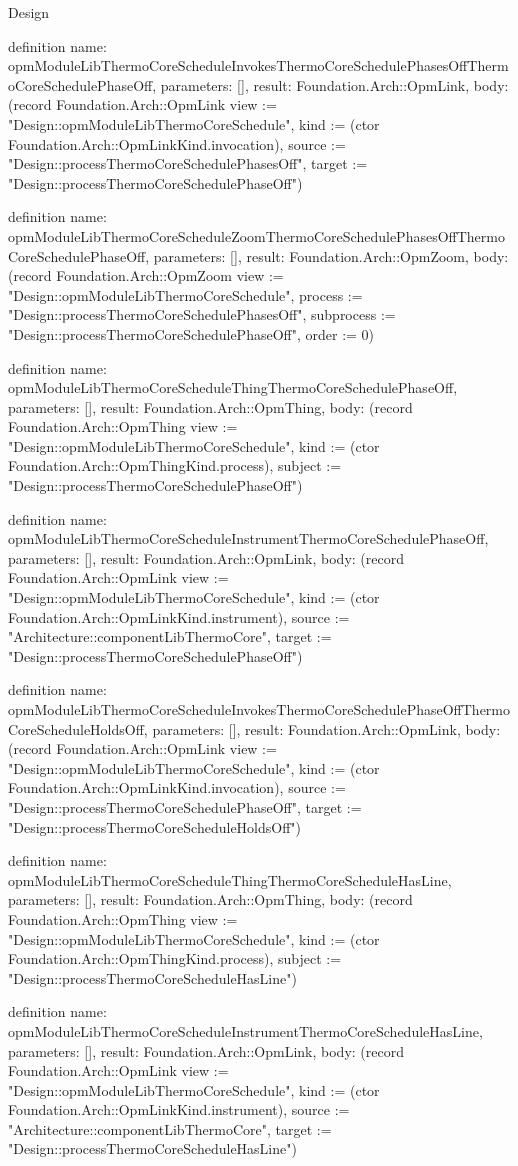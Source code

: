 \begin{lexlean}{Design}
\begin{semanticmodule}
definition{
  name: opmModuleLibThermoCoreScheduleInvokesThermoCoreSchedulePhasesOffThermoCoreSchedulePhaseOff,
  parameters: [],
  result: Foundation.Arch::OpmLink,
  body: (record Foundation.Arch::OpmLink {view := "Design::opmModuleLibThermoCoreSchedule", kind := (ctor Foundation.Arch::OpmLinkKind.invocation), source := "Design::processThermoCoreSchedulePhasesOff", target := "Design::processThermoCoreSchedulePhaseOff"})
}

definition{
  name: opmModuleLibThermoCoreScheduleZoomThermoCoreSchedulePhasesOffThermoCoreSchedulePhaseOff,
  parameters: [],
  result: Foundation.Arch::OpmZoom,
  body: (record Foundation.Arch::OpmZoom {view := "Design::opmModuleLibThermoCoreSchedule", process := "Design::processThermoCoreSchedulePhasesOff", subprocess := "Design::processThermoCoreSchedulePhaseOff", order := 0})
}

definition{
  name: opmModuleLibThermoCoreScheduleThingThermoCoreSchedulePhaseOff,
  parameters: [],
  result: Foundation.Arch::OpmThing,
  body: (record Foundation.Arch::OpmThing {view := "Design::opmModuleLibThermoCoreSchedule", kind := (ctor Foundation.Arch::OpmThingKind.process), subject := "Design::processThermoCoreSchedulePhaseOff"})
}

definition{
  name: opmModuleLibThermoCoreScheduleInstrumentThermoCoreSchedulePhaseOff,
  parameters: [],
  result: Foundation.Arch::OpmLink,
  body: (record Foundation.Arch::OpmLink {view := "Design::opmModuleLibThermoCoreSchedule", kind := (ctor Foundation.Arch::OpmLinkKind.instrument), source := "Architecture::componentLibThermoCore", target := "Design::processThermoCoreSchedulePhaseOff"})
}

definition{
  name: opmModuleLibThermoCoreScheduleInvokesThermoCoreSchedulePhaseOffThermoCoreScheduleHoldsOff,
  parameters: [],
  result: Foundation.Arch::OpmLink,
  body: (record Foundation.Arch::OpmLink {view := "Design::opmModuleLibThermoCoreSchedule", kind := (ctor Foundation.Arch::OpmLinkKind.invocation), source := "Design::processThermoCoreSchedulePhaseOff", target := "Design::processThermoCoreScheduleHoldsOff"})
}

definition{
  name: opmModuleLibThermoCoreScheduleThingThermoCoreScheduleHasLine,
  parameters: [],
  result: Foundation.Arch::OpmThing,
  body: (record Foundation.Arch::OpmThing {view := "Design::opmModuleLibThermoCoreSchedule", kind := (ctor Foundation.Arch::OpmThingKind.process), subject := "Design::processThermoCoreScheduleHasLine"})
}

definition{
  name: opmModuleLibThermoCoreScheduleInstrumentThermoCoreScheduleHasLine,
  parameters: [],
  result: Foundation.Arch::OpmLink,
  body: (record Foundation.Arch::OpmLink {view := "Design::opmModuleLibThermoCoreSchedule", kind := (ctor Foundation.Arch::OpmLinkKind.instrument), source := "Architecture::componentLibThermoCore", target := "Design::processThermoCoreScheduleHasLine"})
}


\end{semanticmodule}
\end{lexlean}

